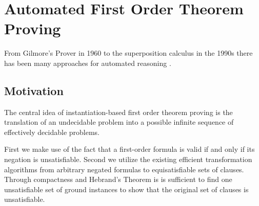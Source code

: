 
\chapter{Automated First Order Theorem Proving}



From Gilmore's Prover \cite{5392528} in 1960 
to the superposition calculus  in the 1990s there has been many approaches for automated reasoning \cite{Robinson:2001:HAR:778522}. 

\section{Motivation}

The central idea of instantiation-based first order theorem proving is the
translation of an undecidable problem into a possible infinite sequence of effectively decidable problems.

First we make use of the fact that a first-order formula is valid if and only if its negation is unsatisfiable.
Second we utilize the existing efficient transformation algorithms from arbitrary negated formulas to equisatisfiable sets of clauses.
Through compactness and Hebrand's Theorem is is sufficient to find one unsatisfiable set of ground instances 
to show that the original set of clauses is unsatisfiable.


